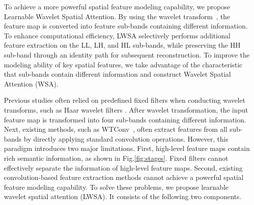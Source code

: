\documentclass[a4paper,fleqn]{cas-dc}
\begin{document}
To achieve a more powerful spatial feature modeling capability, we propose Learnable Wavelet Spatial Attention. By using the wavelet transform~\cite{daubechies1992ten}, the feature map is converted into feature sub-bands containing different information. 
To enhance computational efficiency, LWSA selectively performs additional feature extraction on the LL, LH, and HL sub-bands, while preserving the HH sub-band through an identity path for subsequent reconstruction.
To improve the modeling ability of key spatial features, we take advantage of the characteristic that sub-bands contain different information and construct Wavelet Spatial Attention (WSA).



Previous studies \cite{finder2024wavelet,xue2023smalltrack,he2025mobilemamba} often relied on predefined fixed filters when conducting wavelet transforms, such as {\color{blue}Haar wavelet filters} \cite{finder2022wavelet,gal2021swagan,huang2017wavelet}. After wavelet transformation, the input feature map is transformed into four sub-bands containing different information. Next, existing methods, {such as WTConv~\cite{finder2024wavelet}, often extract features from all sub-bands by directly applying standard convolution operations.} However, this paradigm introduces two major limitations. First, high-level feature maps contain rich semantic information, as shown in Fig.\ref{fig:stages}. Fixed filters cannot effectively separate the information of high-level feature maps. Second, existing convolution-based feature extraction methods cannot achieve a powerful spatial feature modeling capability. To solve these problems, we propose learnable wavelet spatial attention (LWSA). It consists of the following two components.
\end{document}
